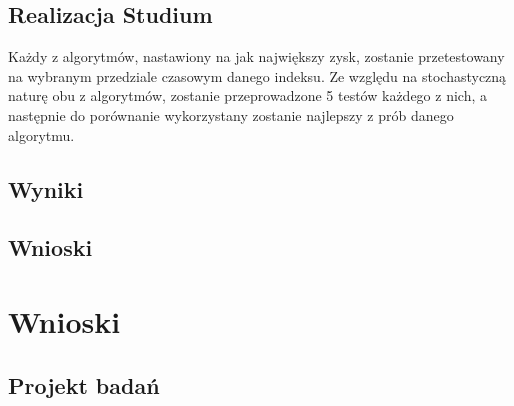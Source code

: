\documentclass[polish,envcountsect,10pt]{article}
\begin{document}
\subsection{Realizacja Studium}

Każdy z algorytmów, nastawiony na jak największy zysk, zostanie przetestowany na wybranym przedziale czasowym danego indeksu. Ze względu na stochastyczną naturę obu z algorytmów, zostanie przeprowadzone 5 testów każdego z nich, a następnie do porównanie wykorzystany zostanie najlepszy z prób danego algorytmu.

\subsection{Wyniki}



\subsection{Wnioski}


\section{Wnioski}

\subsection{Projekt badań}
\end{document}
